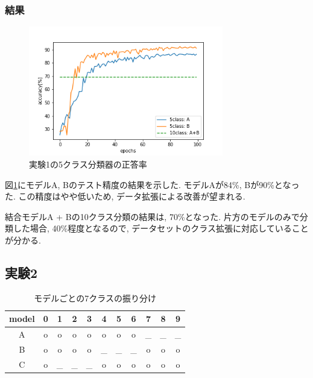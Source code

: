 \documentclass[twocolumn]{jarticle}     %
\begin{document}
\subsubsection{結果}

\begin{figure}[tb]
	\begin{center}
		\includegraphics[clip,width=8.5cm]{accuracy5.png}
		\caption{実験1の5クラス分類器の正答率}
		\label{fig:accuracy5}
	\end{center}
\end{figure}

図\ref{fig:accuracy5}にモデルA, Bのテスト精度の結果を示した.
モデルAが84\%, Bが90\%となった. この精度はやや低いため, データ拡張による改善が望まれる.

結合モデルA + Bの10クラス分類の結果は, 70\%となった.
片方のモデルのみで分類した場合, 40\%程度となるので, データセットのクラス拡張に対応していることが分かる.

\subsection{実験2}

\begin{table}[tb]
  \begin{center}
    \caption{モデルごとの7クラスの振り分け}
    \begin{tabular}{|c||c|c|c|c|c|c|c|c|c|c|} \hline
      model & 0 & 1 & 2 & 3 & 4 & 5 & 6 & 7 & 8 & 9 \\ \hline\hline
      A     & o & o & o & o & o & o & o & _ & _ & _ \\ \hline
      B     & o & o & o & o & _ & _ & _ & o & o & o \\ \hline
      C     & o & _ & _ & _ & o & o & o & o & o & o \\ \hline
    \end{tabular}
    \label{tab:class7}
  \end{center}
\end{table}
\end{document}
